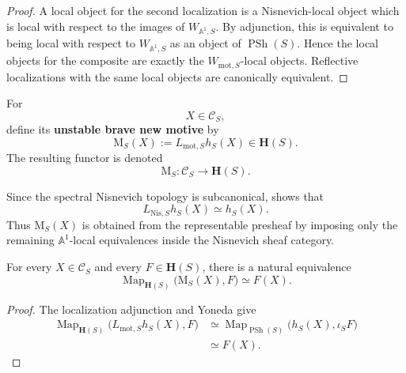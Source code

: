 \begin{proof}
A local object for the second localization is a Nisnevich-local object
which is local with respect to the images of
\(W_{\mathbb A^1,S}\).  By adjunction, this is equivalent to being local
with respect to \(W_{\mathbb A^1,S}\) as an object of
\(\operatorname{PSh}(S)\).  Hence the local objects for the composite
are exactly the \(W_{\mathrm{mot},S}\)-local objects.  Reflective
localizations with the same local objects are canonically equivalent.
\end{proof}

\begin{definition}
\label{def:brave-new-smooth-motive}
For
\[
    X
    \in
    \mathcal C_S,
\]
define its \textbf{unstable brave new motive} by
\[
    \mathrm M_S(X)
    :=
    L_{\mathrm{mot},S}h_S(X)
    \in
    \mathbf H(S).
\]
The resulting functor is denoted
\[
    \mathrm M_S
    \colon
    \mathcal C_S
    \longrightarrow
    \mathbf H(S).
\]
\end{definition}

Since the spectral Nisnevich topology is subcanonical,
shows that
\[
    L_{\mathrm{Nis},S}h_S(X)
    \simeq
    h_S(X).
\]
Thus \(\mathrm M_S(X)\) is obtained from the representable presheaf by
imposing only the remaining \(\mathbb A^1\)-local equivalences inside
the Nisnevich sheaf category.

\begin{proposition}
\label{prop:motivic-evaluation-represented}
For every \(X\in\mathcal C_S\) and every
\(F\in\mathbf H(S)\), there is a natural equivalence
\[
    \operatorname{Map}_{\mathbf H(S)}
    \bigl(
        \mathrm M_S(X),
        F
    \bigr)
    \simeq
    F(X).
\]
\end{proposition}

\begin{proof}
The localization adjunction and Yoneda give
\[
\begin{aligned}
    \operatorname{Map}_{\mathbf H(S)}
    \bigl(
        L_{\mathrm{mot},S}h_S(X),
        F
    \bigr)
    &\simeq
    \operatorname{Map}_{\operatorname{PSh}(S)}
    \bigl(
        h_S(X),
        \iota_SF
    \bigr)
    \\
    &\simeq
    F(X).
\end{aligned}
\]
\end{proof}

